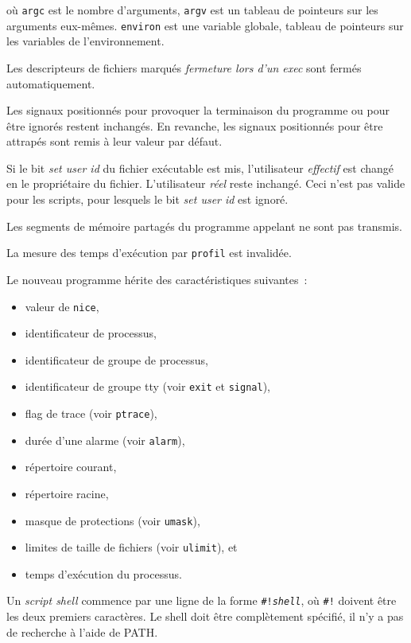 \documentclass [twoside] {report}
\begin{document}
où {\tt argc} est le nombre d'arguments, {\tt argv}
est un tableau de pointeurs sur les arguments
eux-mêmes. {\tt environ} est une variable globale,
tableau de pointeurs sur les variables de l'environnement.

Les descripteurs de fichiers marqués {\it fermeture
lors d'un exec} sont fermés automatiquement.

Les signaux positionnés pour provoquer la terminaison
du programme ou pour être ignorés restent
inchangés. En revanche, les signaux positionnés
pour être attrapés sont remis à leur valeur par
défaut.

Si le bit {\it set user id} du fichier exécutable
est mis, l'utilisateur {\it effectif} est changé en le
propriétaire du fichier. L'utilisateur {\it réel}
reste inchangé. Ceci n'est pas valide pour les
scripts, pour lesquels le bit {\it set user id} est
ignoré.

Les segments de mémoire partagés du programme
appelant ne sont pas transmis.

La mesure des temps d'exécution par {\tt profil} est
invalidée.

Le nouveau programme hérite des caractéristiques
suivantes~:
\begin {itemize}
    \item valeur de {\tt nice},
    \item identificateur de processus,
    \item identificateur de groupe de processus,
    \item identificateur de groupe tty (voir {\tt exit} et {\tt signal}),
    \item flag de trace (voir {\tt ptrace}),
    \item durée d'une alarme (voir {\tt alarm}),
    \item répertoire courant,
    \item répertoire racine,
    \item masque de protections (voir {\tt umask}),
    \item limites de taille de fichiers (voir {\tt ulimit}), et
    \item temps d'exécution du processus.
\end {itemize}

Un {\it script shell} commence par une ligne de la
forme {\tt \#!{\it shell}}, où {\tt \#!} doivent être les deux
premiers caractères. Le shell doit être
complètement spécifié, il n'y a pas de recherche à
l'aide de PATH.
\end{document}
